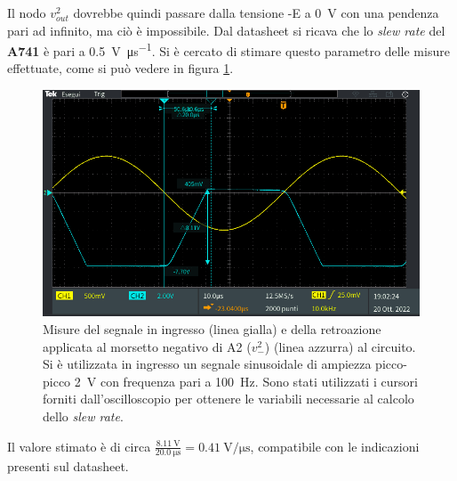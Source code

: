 Il nodo $v_{out}^2$ dovrebbe quindi passare dalla tensione -E a \SI{0}{\volt} con una pendenza pari ad infinito, ma ciò è impossibile. Dal datasheet si ricava che lo \textit{slew rate} del \textbf{\textmu A741} è pari a \SI{0.5}{\volt\per\micro\second}. Si è cercato di stimare questo parametro delle misure effettuate, come si può vedere in figura \ref{fig:a2_slew_rate_calc}.
\begin{figure}[h]
	\centering
	\includegraphics[width=\linewidth]{./ImageFiles/Laboratorio 3/TEK00006}
	\caption{Misure del segnale in ingresso (linea gialla) e della retroazione applicata al morsetto negativo di A2 ($v_-^2$) (linea azzurra) al circuito. Si è utilizzata in ingresso un segnale sinusoidale di ampiezza picco-picco \SI{2}{\volt} con frequenza pari a \SI{100}{\hertz}. Sono stati utilizzati i cursori forniti dall'oscilloscopio per ottenere le variabili necessarie al calcolo dello \textit{slew rate}.}
	\label{fig:a2_slew_rate_calc}
\end{figure}
Il valore stimato è di circa $\frac{\SI{8.11}{\volt}}{\SI{20.0}{\micro\second}}=\SI{0.41}{\volt\per\micro\second}$, compatibile con le indicazioni presenti sul datasheet.


